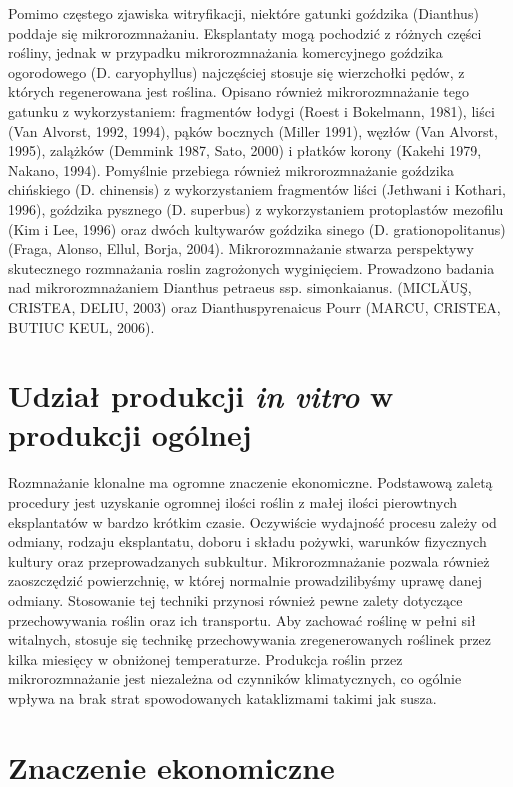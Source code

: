 \documentclass[two column, twoside, a4paper]{article}
\begin{document}
Pomimo częstego zjawiska witryfikacji, niektóre gatunki goździka (Dianthus) poddaje się mikrorozmnażaniu. Eksplantaty mogą pochodzić z różnych części rośliny, jednak w przypadku mikrorozmnażania komercyjnego goździka ogorodowego (D. caryophyllus) najczęściej stosuje się wierzchołki pędów, z których regenerowana jest roślina. Opisano również mikrorozmnażanie tego gatunku z wykorzystaniem: fragmentów łodygi (Roest i Bokelmann, 1981), liści (Van Alvorst, 1992, 1994), pąków bocznych (Miller 1991), węzłów (Van Alvorst, 1995), zalążków (Demmink 1987, Sato, 2000) i płatków korony (Kakehi 1979,  Nakano, 1994). Pomyślnie przebiega również mikrorozmnażanie goździka chińskiego (D. chinensis) z wykorzystaniem fragmentów liści (Jethwani i Kothari, 1996), goździka pysznego (D. superbus) z wykorzystaniem protoplastów mezofilu (Kim i Lee, 1996) oraz dwóch kultywarów goździka sinego (D. grationopolitanus) (Fraga, Alonso, Ellul, Borja, 2004). Mikrorozmnażanie stwarza perspektywy skutecznego rozmnażania roslin zagrożonych wyginięciem. Prowadzono badania nad mikrorozmnażaniem Dianthus petraeus ssp. simonkaianus. (MICLĂUŞ, CRISTEA, DELIU, 2003) oraz Dianthuspyrenaicus Pourr (MARCU, CRISTEA, BUTIUC KEUL, 2006).


\section{Udział produkcji \textit{in vitro} w produkcji ogólnej}

Rozmnażanie klonalne ma ogromne znaczenie ekonomiczne. Podstawową zaletą procedury jest uzyskanie ogromnej ilości roślin z małej ilości pierowtnych eksplantatów w bardzo krótkim czasie. Oczywiście wydajność procesu zależy od odmiany, rodzaju eksplantatu, doboru i składu pożywki, warunków fizycznych kultury oraz przeprowadzanych subkultur. Mikrorozmnażanie pozwala również zaoszczędzić powierzchnię, w której normalnie prowadzilibyśmy uprawę danej odmiany. Stosowanie tej techniki przynosi również pewne zalety dotyczące przechowywania roślin oraz ich transportu. Aby zachować roślinę w pełni sił witalnych, stosuje się technikę przechowywania zregenerowanych roślinek przez kilka miesięcy w obniżonej temperaturze.
Produkcja roślin przez mikrorozmnażanie jest niezależna od czynników klimatycznych, co ogólnie wpływa na brak strat spowodowanych kataklizmami takimi jak susza.

\section{Znaczenie ekonomiczne}
\end{document}
